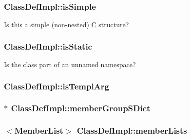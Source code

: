 \subsubsection[{is\+Simple}]{ Class\+Def\+Impl\+::is\+Simple}\label{class_class_def_impl_a066ef909e009befddbd31341b9ddbb5b}
Is this a simple (non-\/nested) \hyperlink{class_c}{C} structure? \hypertarget{class_class_def_impl_a13a7bfbb253abb17959c8fa78d565c51}{}
\subsubsection[{is\+Static}]{ Class\+Def\+Impl\+::is\+Static}\label{class_class_def_impl_a13a7bfbb253abb17959c8fa78d565c51}
Is the class part of an unnamed namespace? \hypertarget{class_class_def_impl_a3a2227e55d99c40327f87f5efe096061}{}
\subsubsection[{is\+Templ\+Arg}]{ Class\+Def\+Impl\+::is\+Templ\+Arg}\label{class_class_def_impl_a3a2227e55d99c40327f87f5efe096061}
\hypertarget{class_class_def_impl_a0210b427b08a04f20bd5eb24c3bb6f11}{}
\subsubsection[{member\+Group\+S\+Dict}]{$\ast$ Class\+Def\+Impl\+::member\+Group\+S\+Dict}\label{class_class_def_impl_a0210b427b08a04f20bd5eb24c3bb6f11}
\hypertarget{class_class_def_impl_a08ae5698e8b933ec25f894f6e87ad1b1}{}
\subsubsection[{member\+Lists}]{$<${\bf Member\+List}$>$ Class\+Def\+Impl\+::member\+Lists}\label{class_class_def_impl_a08ae5698e8b933ec25f894f6e87ad1b1}
\hypertarget{class_class_def_impl_ab613a11051f5ad3265ddc3b25ef50a82}{}
